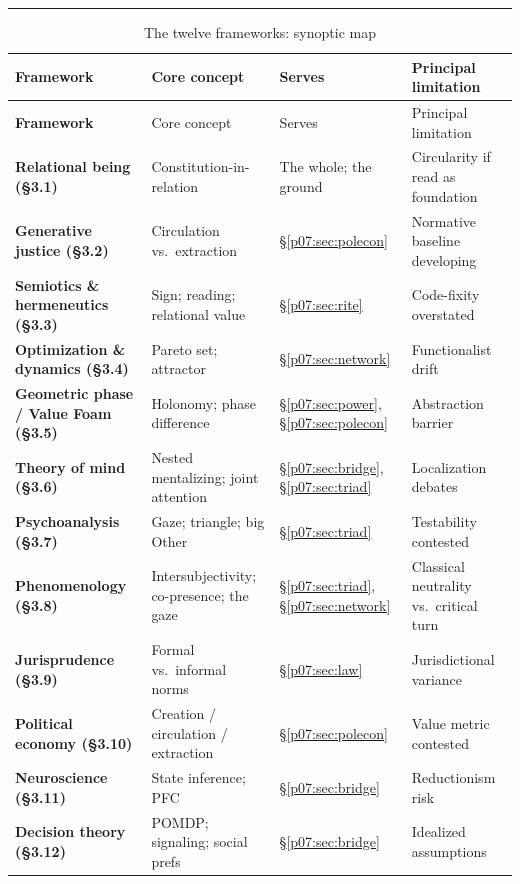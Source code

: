 \documentclass[11pt,a4paper]{article}
\newcommand{\goldrule}{\noindent\textcolor{gold}{\rule{\linewidth}{0.6pt}}\par\vspace{0.4em}}
\newcommand{\xref}[1]{\textcolor{rose}{\S\ref{#1}}}
\newcommand{\pinkref}[1]{\textcolor{rose}{#1}}
\begin{document}
\goldrule
\begin{landscape}
\footnotesize
\begin{longtable}{>{\bfseries\color{rosedeep}}p{2.8cm} Y Y Y}
\caption{The twelve frameworks: synoptic map}\label{p07:tab:frameworks}\\
\toprule
{}
Framework & Core concept & Serves & Principal limitation \\
\midrule
\endfirsthead
{}
Framework & Core concept & Serves & Principal limitation \\
\midrule
\endhead
Relational being (\pinkref{§3.1}) & Constitution-in-relation & The whole; the ground & Circularity if read as foundation \\
Generative justice (\pinkref{§3.2}) & Circulation vs.\ extraction & \xref{p07:sec:polecon} & Normative baseline developing \\
Semiotics \& hermeneutics (\pinkref{§3.3}) & Sign; reading; relational value & \xref{p07:sec:rite} & Code-fixity overstated \\
Optimization \& dynamics (\pinkref{§3.4}) & Pareto set; attractor & \xref{p07:sec:network} & Functionalist drift \\
Geometric phase / Value Foam (\pinkref{§3.5}) & Holonomy; phase difference & \xref{p07:sec:power}, \xref{p07:sec:polecon} & Abstraction barrier \\
Theory of mind (\pinkref{§3.6}) & Nested mentalizing; joint attention & \xref{p07:sec:bridge}, \xref{p07:sec:triad} & Localization debates \\
Psychoanalysis (\pinkref{§3.7}) & Gaze; triangle; big Other & \xref{p07:sec:triad} & Testability contested \\
Phenomenology (\pinkref{§3.8}) & Intersubjectivity; co-presence; the gaze & \xref{p07:sec:triad}, \xref{p07:sec:network} & Classical neutrality vs.\ critical turn \\
Jurisprudence (\pinkref{§3.9}) & Formal vs.\ informal norms & \xref{p07:sec:law} & Jurisdictional variance \\
Political economy (\pinkref{§3.10}) & Creation / circulation / extraction & \xref{p07:sec:polecon} & Value metric contested \\
Neuroscience (\pinkref{§3.11}) & State inference; PFC & \xref{p07:sec:bridge} & Reductionism risk \\
Decision theory (\pinkref{§3.12}) & POMDP; signaling; social prefs & \xref{p07:sec:bridge} & Idealized assumptions \\
\bottomrule
\end{longtable}
\end{landscape}
\end{document}
